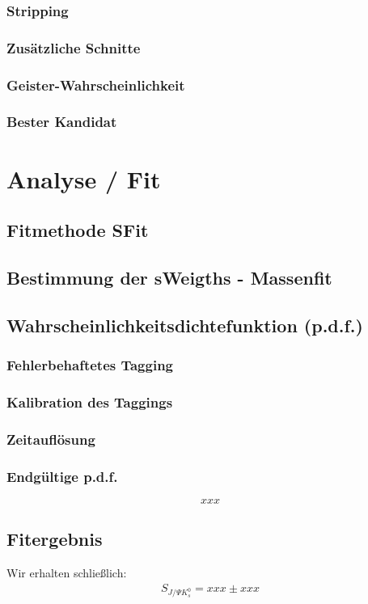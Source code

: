 \documentclass[a4paper]{scrbook}
\newcommand{\SJPsi}{S_{J/\Psi K_s^0}}
\begin{document}
\subsection{Stripping}
\subsection{Zusätzliche Schnitte}
\subsection{Geister-Wahrscheinlichkeit}
\subsection{Bester Kandidat}

\chapter{Analyse / Fit}
\section{Fitmethode SFit}
\section{Bestimmung der sWeigths - Massenfit}
\section{Wahrscheinlichkeitsdichtefunktion (p.d.f.)}
\subsection{Fehlerbehaftetes Tagging}
\subsection{Kalibration des Taggings}
\subsection{Zeitauflösung}
\subsection{Endgültige p.d.f.}
\begin{equation}
xxx     \label{eg:fit_pdf}
\end{equation}

\section{Fitergebnis} \label{kap:fitergebnis}
Wir erhalten schließlich:
\begin{align}
\SJPsi = xxx \pm xxx     \label{eq:fit_result}
\end{align}
\end{document}
